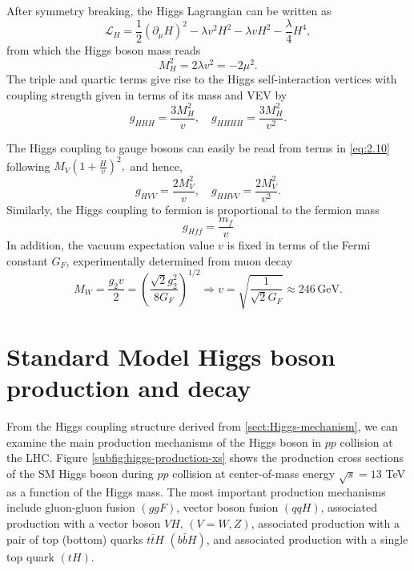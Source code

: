 After symmetry breaking, the Higgs Lagrangian can be written as
\begin{equation}
    \label{eq:2.18}
    \mathcal{L}_H = \frac{1}{2}(\partial_{\mu} H)^2 - \lambda v^2H^2 - \lambda v H^2 - \frac{\lambda}{4}H^4,
\end{equation}
from which the Higgs boson mass reads 
\begin{equation}
    \label{eq:2.19}
    M_H^2 = 2\lambda v^2 = -2\mu^2.
\end{equation}
The triple and quartic terms give rise to the Higgs self-interaction vertices with coupling strength given in terms of its mass and VEV by 
\begin{equation}
    \label{eq:2.20}
    g_{HHH} = \frac{3M_H^2}{v}, \quad g_{HHHH} = \frac{3M_H^2}{v^2}.
\end{equation}

The Higgs coupling to gauge bosons can easily be read from terms in \eqref{eq:2.10} following $M_V\left(1+\frac{H}{v}\right)^2,$
and hence,
\begin{equation}
    \label{eq:2.21}
    g_{HVV} = \frac{2M_V^2}{v}, \quad g_{HHVV} = \frac{2M_V^2}{v^2}.
\end{equation}
Similarly, the Higgs coupling to fermion is proportional to the fermion mass
\begin{equation}
    \label{eq:2.22}
    g_{Hff} = \frac{m_f}{v}
\end{equation}
In addition, the vacuum expectation value $v$ is fixed in terms of the Fermi constant $G_F$, experimentally determined from muon decay
\begin{equation}
    \label{eq:2.23}
    M_W = \frac{g_2v}{2}  = \left(\frac{\sqrt{2}g_2^2}{8G_F}\right)^{1/2} \Rightarrow v = \sqrt{\frac{1}{\sqrt{2}G_F}} \approx 246 \,\mathrm{GeV}.
\end{equation}

\section{Standard Model Higgs boson production and decay}
\label{sect:higgs-production}
From the Higgs coupling structure derived from \ref{sect:Higgs-mechanism}, we can examine the main production mechanisms of the Higgs boson in $pp$ collision at the LHC. Figure \ref{subfig:higgs-production-xs} shows the production cross sections of the SM Higgs boson during $pp$ collision at center-of-mass energy $\sqrt{s}=13$ TeV as a function of the Higgs mass. 
The most important production mechanisms include gluon-gluon fusion $(ggF)$, vector boson fusion $(qqH)$, associated production with a vector boson $VH,\,(V=W,Z)$, associated production with a pair of top (bottom) quarks $t\bar{t}H$ $(b\bar{b}H)$, and associated production with a single top quark $(tH)$.

